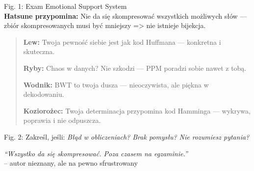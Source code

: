 \documentclass{../konspekt}
\begin{document}
\begin{multicols}{2}
\begin{multicols}{2}
\begin{center}
      \begin{center}
        Fig. 1: Exam Emotional Support System\\
        \textbf{Hatsune przypomina:} Nie da się skompresować
        wszystkich możliwych słów — zbiór skompresowanych musi być
        mniejszy => nie istnieje bijekcja.

      \end{center}
    \end{center}
    \columnbreak
    \begin{quote}
      \textbf{Lew:} Twoja pewność siebie jest jak kod Huffmana —
      konkretna i skuteczna.

      \textbf{Ryby:} Chaos w danych? Nie szkodzi — PPM poradzi sobie
      nawet z tobą.

      \textbf{Wodnik:} BWT to twoja dusza — nieoczywista, ale piękna
      w dekodowaniu.

      \textbf{Koziorożec:} Twoja determinacja przypomina kod Hamminga
      — wykrywa, poprawia i nie odpuszcza.
    \end{quote}

  \end{multicols}

  \begin{center}
    \fbox{\phantom{\rule{1em}{1em}}}
    \fbox{\phantom{\rule{1em}{1em}}}
    \fbox{\phantom{\rule{1em}{1em}}}
    \fbox{\phantom{\rule{1em}{1em}}}
    \fbox{\phantom{\rule{1em}{1em}}}
  \end{center}
  \vspace{-0.8em}
  \begin{center}
    \footnotesize Fig. 2: Zakreśl, jeśli: \textit{Błąd w
    obliczeniach? Brak pomysłu? Nie rozumiesz pytania?}
  \end{center}
  \begin{center}
    \vspace{-0.5em}
    \textit{“Wszystko da się skompresować. Poza czasem na egzaminie.”} \\
    -- autor nieznany, ale na pewno sfrustrowany
  \end{center}
\end{multicols}
\end{document}
